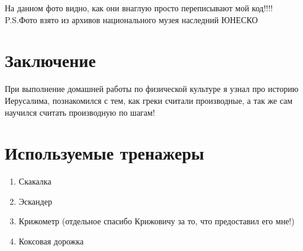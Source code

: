 \documentclass[a4paper,12pt]{article}
\begin{document}
 На данном фото видно, как они внаглую просто переписывают мой код!!!! P.S.Фото взято из архивов национального музея наследний ЮНЕСКО

\section{Заключение}
 При выполнение домашней работы по физической культуре я узнал про историю Иерусалима, познакомился с тем, как греки считали производные, а так же сам научился считать производную по шагам!
\section{Используемые тренажеры}
 \begin{enumerate}
 \item Скакалка
 \item Эскандер
 \item Крижометр (отдельное спасибо Крижовичу за то, что предоставил его мне!)
 \item Коксовая дорожка
 \end{enumerate}
\end{document}
